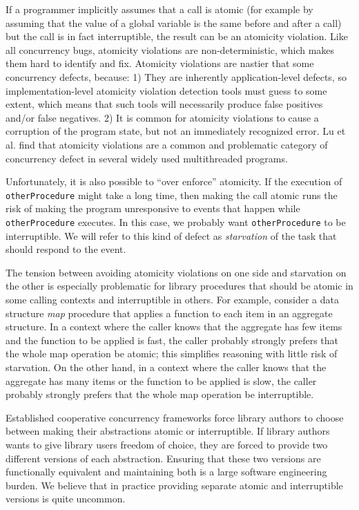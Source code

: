 \documentclass[a4paper,UKenglish,cleveref, autoref]{lipics-v2019}
\begin{document}
If a programmer implicitly assumes that a call is atomic (for example by assuming that the value of a global variable is the same before and after a call) but the call is in fact interruptible, the result can be an atomicity violation.
Like all concurrency bugs, atomicity violations are non-deterministic, which makes them hard to identify and fix.
Atomicity violations are nastier that some concurrency defects, because:
1) They are inherently application-level defects, so implementation-level atomicity violation detection tools must guess to some extent, which means that such tools will necessarily produce false positives and/or false negatives.
2) It is common for atomicity violations to cause a corruption of the program state, but not an immediately recognized error.
Lu et al. \cite{Lu2008} find that atomicity violations are a common and problematic category of concurrency defect in several widely used multithreaded programs.

Unfortunately, it is also possible to ``over enforce'' atomicity.
If the execution of \texttt{otherProcedure} might take a long time\footnotemark{}, then making the call atomic runs the risk of making the program unresponsive to events that happen while \texttt{otherProcedure} executes.
In this case, we probably want \texttt{otherProcedure} to be interruptible.
We will refer to this kind of defect as \emph{starvation} of the task that should respond to the event.


The tension between avoiding atomicity violations on one side and starvation on the other is especially problematic for library procedures that should be atomic in some calling contexts and interruptible in others.
For example, consider a data structure \emph{map} procedure that applies a function to each item in an aggregate structure.
In a context where the caller knows that the aggregate has few items and the function to be applied is fast, the caller probably strongly prefers that the whole map operation be atomic; this simplifies reasoning with little risk of starvation.
On the other hand, in a context where the caller knows that the aggregate has many items or the function to be applied is slow, the caller probably strongly prefers that the whole map operation be interruptible.

Established cooperative concurrency frameworks force library authors to choose between making their abstractions atomic or interruptible.
If library authors wants to give library users freedom of choice, they are forced to provide two different versions of each abstraction.
Ensuring that these two versions are functionally equivalent and maintaining both is a large software engineering burden.
We believe that in practice providing separate atomic and interruptible versions is quite uncommon.
\end{document}
